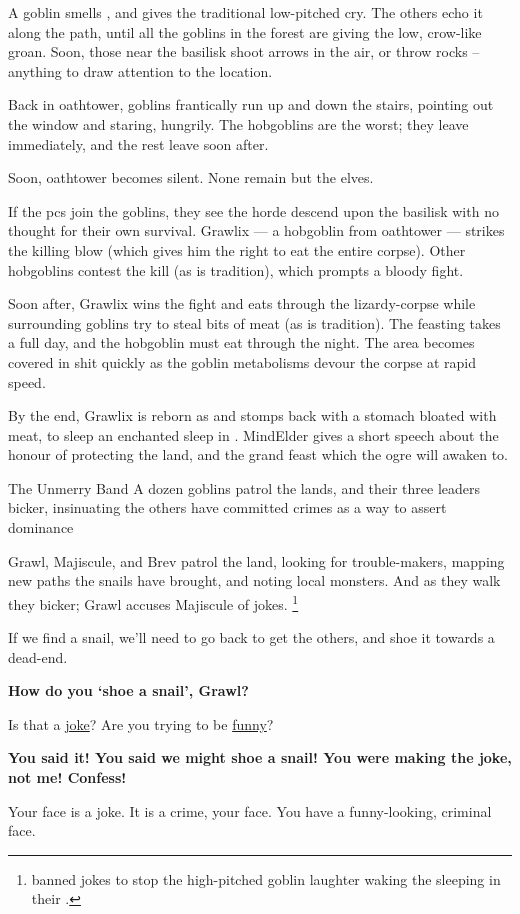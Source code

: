 A goblin smells , and gives the traditional low-pitched cry.
The others echo it along the path, until all the goblins in the forest are giving the low, crow-like groan.
Soon, those near the \gls{basilisk} shoot arrows in the air, or throw rocks -- anything to draw attention to the location.

Back in \gls{oathtower}, goblins frantically run up and down the stairs, pointing out the window and staring, hungrily.
The hobgoblins are the worst; they leave immediately, and the rest leave soon after.

Soon, \gls{oathtower} becomes silent.
None remain but the elves.

If the \glspl{pc} join the goblins, they see the horde descend upon the \gls{basilisk} with no thought for their own survival.
Grawlix --- a hobgoblin from \gls{oathtower} --- strikes the killing blow (which gives him the right to eat the entire corpse).
Other hobgoblins contest the kill (as is tradition), which prompts a bloody fight.

\basilisk

Soon after, Grawlix wins the fight and eats through the lizardy-corpse while surrounding goblins try to steal bits of meat (as is tradition).
The feasting takes a full day, and the hobgoblin must eat through the night.
The area becomes covered in shit quickly as the goblin metabolisms devour the corpse at rapid speed.

By the end, Grawlix is reborn as  and stomps back with a stomach bloated with meat, to sleep an enchanted sleep in .
\Gls{MindElder} gives a short speech about the honour of protecting the land, and the grand feast which the \gls{ogre} will awaken to.

{The Unmerry Band}%
{A dozen goblins patrol the lands, and their three leaders bicker, insinuating the others have committed crimes as a way to assert dominance}%

Grawl, Majiscule, and Brev patrol the land, looking for trouble-makers, mapping new paths the snails have brought, and noting local monsters.
And as they walk they bicker; Grawl accuses Majiscule of jokes.%
\footnote{ banned jokes to stop the high-pitched goblin laughter waking the  sleeping in their .}

\begin{speechtext}
  If we find a snail, we'll need to go back to get the others, and shoe it towards a dead-end.

  \textbf{How do you `shoe a snail', Grawl?}

  Is that a \underline{joke}?
  Are you trying to be \underline{funny}?

  \textbf{You said it!
  You said we might shoe a snail!
  You were making the joke, not me!
  Confess!}

  Your face is a joke.
  It is a crime, your face.
  You have a funny-looking, criminal face.
\end{speechtext}

